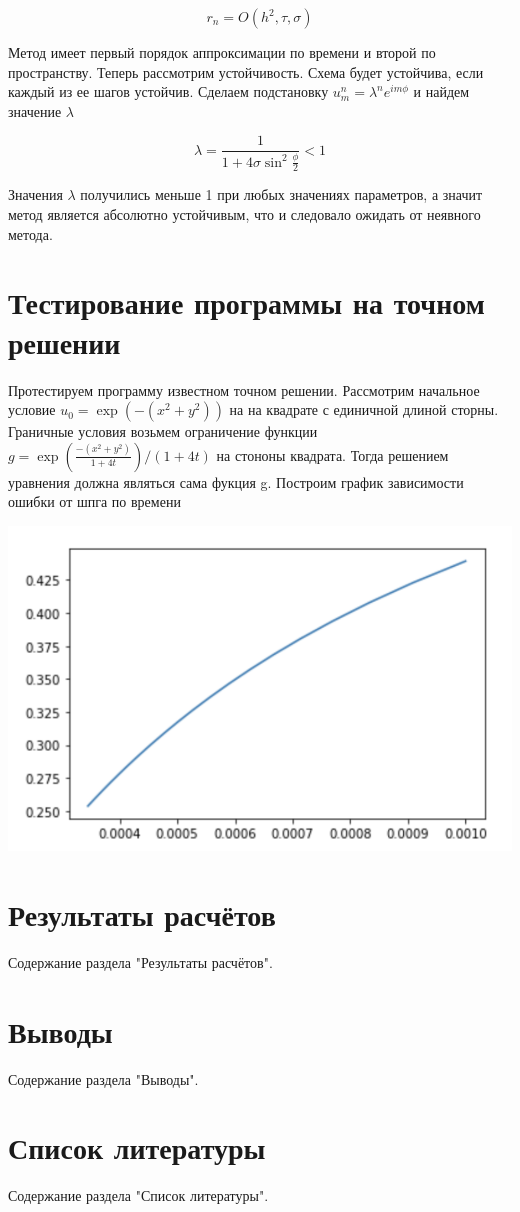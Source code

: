 \documentclass[a4paper]{article}
\begin{document}
\begin{equation}
	r_n = O(h^2, \tau, \sigma)
\end{equation}

Метод имеет первый порядок аппроксимации по времени и второй по пространству. Теперь рассмотрим устойчивость. Схема будет устойчива, если каждый из ее шагов устойчив. Сделаем подстановку $u_{m}^{n} = \lambda^n e^{i m \phi}$ и найдем значение $\lambda$

\begin{equation}
	\lambda = \frac{1}{1 + 4 \sigma \sin^2{\frac{\phi}{2}}} < 1 
\end{equation}

Значения $\lambda$ получились меньше 1 при любых значениях параметров, а значит метод является абсолютно устойчивым, что и следовало ожидать от неявного метода.

\section{Тестирование программы на точном решении}
Протестируем программу известном точном решении. Рассмотрим начальное условие $u_0 = \exp(-(x^2 + y^2))$ на на квадрате с единичной длиной сторны. Граничные условия возьмем ограничение функции $g = \exp(\frac{-(x^2 + y^2)}{1 + 4 t}) / (1 + 4 t)$ на стононы квадрата. Тогда решением уравнения должна являться сама фукция g. Построим график зависимости ошибки от шпга по времени 

\begin{center}
	\includegraphics{1.png}
\end{center}

\section{Результаты расчётов}
Содержание раздела "Результаты расчётов".

\section{Выводы}
Содержание раздела "Выводы".

\section{Список литературы}
Содержание раздела "Список литературы".
\end{document}

